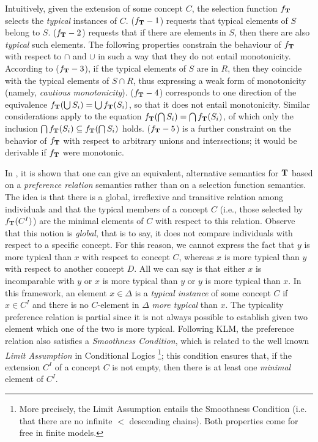 \documentclass[a4paper, 11pt, oneside]{duthesis}
\newcommand{\tip}{{\bf T}}
\newcommand{\incluso} {\subseteq}
\begin{document}
\noindent Intuitively, given the extension of some concept $C$, the selection function $f_\tip$ selects  the {\em typical} instances of $C$.
($f_\tip-1$) requests that typical elements of $S$ belong to $S$.
($f_\tip-2$) requests that if there are elements in $S$, then there are also {\em typical} such elements.
The following properties constrain the behaviour of $f_\tip$ with respect to $\cap$ and $\cup$ in such a way that they do not entail monotonicity.
According to ($f_\tip-3$), if the typical elements of $S$ are in $R$, then they coincide with the typical elements of $S \cap R$, thus expressing a weak form of monotonicity (namely, {\em cautious monotonicity}).
($f_\tip-4$) corresponds to one direction of the equivalence $f_\tip(\bigcup S_i) = \bigcup f_\tip(S_i)$, so that it does not entail monotonicity.
Similar considerations apply to the equation $f_\tip(\bigcap S_i) = \bigcap f_\tip(S_i)$, of which only the inclusion $\bigcap f_\tip(S_i) \incluso f_\tip(\bigcap S_i)$ holds. ($f_\tip-5$) is a further constraint on the behavior of $f_\tip$ with respect to arbitrary unions and intersections; it would be derivable if $f_\tip$ were monotonic.

In \cite{FI09}, it is shown that one can give an equivalent, alternative semantics for $\tip$ based on a \emph{preference relation} semantics rather than on a selection function semantics.
The idea is that there is a global, irreflexive and transitive relation among individuals and that the typical members of a concept $C$ (i.e., those selected by $f_\tip(C^I)$) are the minimal elements of $C$ with respect to this relation.
Observe that this notion is \emph{global}, that is to say, it does not compare individuals with respect to a specific concept.
For this reason,  we cannot express the fact that $y$ is more typical than $x$ with respect to concept $C$, whereas $x$ is more typical than $y$ with respect to another concept $D$.
All we can say is that either $x$ is incomparable with $y$ or $x$ is more typical than $y$ or $y$ is more typical than $x$.
In this framework, an element $x \in \Delta$ is a {\em typical instance} of some concept $C$ if $x \in C^I$ and there is no $C$-element in $\Delta$ {\em more typical} than $x$.
The typicality preference relation is partial since it is not always possible to establish given two element which one of the two is more typical.
Following KLM, the preference relation also satisfies a \emph{Smoothness Condition}, which is related to the well known \emph{Limit Assumption} in Conditional Logics \cite{Nute80}
\footnote{More precisely, the Limit Assumption entails the Smoothness Condition (i.e. that there are no infinite $<$ descending chains). Both properties come for free in finite models.};
this condition ensures that, if the extension $C^I$ of a concept $C$ is not empty, then there is at least one \emph{minimal} element of $C^I$.
\end{document}
